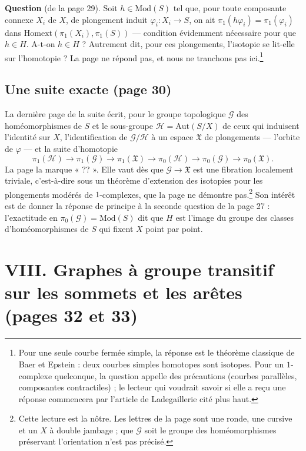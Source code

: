 \documentclass[11pt,a4paper]{article}
\begin{document}
\textbf{Question} (de la page 29). Soit $h \in \mathrm{Mod}(S)$ tel que, pour
toute composante connexe $X_i$ de $X$, de plongement induit
$\varphi_i : X_i \to S$, on ait
$\pi_1(h\varphi_i) = \pi_1(\varphi_i)$ dans
$\mathrm{Homext}(\pi_1(X_i), \pi_1(S))$ --- condition évidemment nécessaire
pour que $h \in H$. A-t-on $h \in H$ ? Autrement dit, pour ces plongements,
l'isotopie se lit-elle sur l'homotopie ? La page ne répond pas, et nous ne
tranchons pas ici.\footnote{Pour une seule courbe fermée simple, la réponse
est le théorème classique de Baer et Epstein : deux courbes simples
homotopes sont isotopes. Pour un $1$-complexe quelconque, la question
appelle des précautions (courbes parallèles, composantes contractiles) ; le
lecteur qui voudrait savoir si elle a reçu une réponse commencera par
l'article de Ladegaillerie cité plus haut.}

\subsection*{Une suite exacte (page 30)}

La dernière page de la suite écrit, pour le groupe topologique
$\mathcal{G}$ des homéomorphismes de $S$ et le sous-groupe
$\mathcal{H} = \mathrm{Aut}(S/X)$ de ceux qui induisent l'identité sur $X$,
l'identification de $\mathcal{G}/\mathcal{H}$ à un espace $\mathfrak{X}$ de
plongements --- l'orbite de $\varphi$ --- et la suite d'homotopie
\[
\pi_1(\mathcal{H}) \to \pi_1(\mathcal{G}) \to \pi_1(\mathfrak{X}) \to \pi_0(\mathcal{H}) \to \pi_0(\mathcal{G}) \to \pi_0(\mathfrak{X}).
\]
La page la marque « ?? ». Elle vaut dès que $\mathcal{G} \to \mathfrak{X}$ est
une fibration localement triviale, c'est-à-dire sous un théorème d'extension
des isotopies pour les plongements modérés de $1$-complexes, que la page ne
démontre pas.\footnote{Cette lecture est la nôtre. Les lettres de la page
sont une ronde, une cursive et un $X$ à double jambage ; que $\mathcal{G}$
soit le groupe des homéomorphismes préservant l'orientation n'est pas
précisé.} Son intérêt est de donner la réponse de principe à la seconde
question de la page 27 : l'exactitude en $\pi_0(\mathcal{G}) = \mathrm{Mod}(S)$
dit que $H$ est l'image du groupe des classes d'homéomorphismes de $S$ qui
fixent $X$ point par point.

\section*{VIII. Graphes à groupe transitif sur les sommets et les arêtes (pages 32 et 33)}
\end{document}
